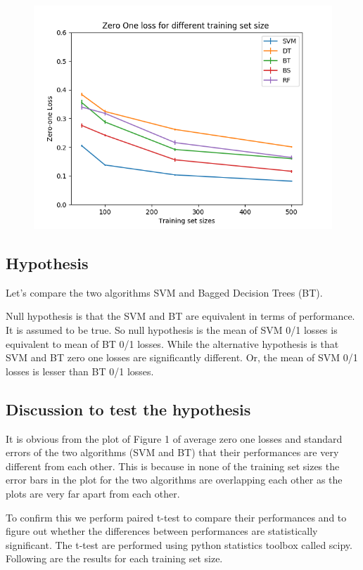 \documentclass[12pt]{article}
\begin{document}
\begin{figure}
	\centering
	\includegraphics{Analysis1.png}
\end{figure}

\subsection{Hypothesis}

Let's compare the two algorithms SVM and Bagged Decision Trees (BT). 

Null hypothesis is that the SVM and BT are equivalent in terms of performance. It is assumed
to be true. So null hypothesis is the mean of SVM 0/1 losses is equivalent to mean of BT 0/1 losses. 
While the alternative hypothesis is that SVM and BT zero one losses are significantly different.
Or, the mean of SVM 0/1 losses is lesser than BT 0/1 losses.

\subsection{Discussion to test the hypothesis}

It is obvious from the plot of Figure 1 of average zero one losses and standard errors of the two
algorithms (SVM and BT) that their performances are very different from each other. This is because
in none of the training set sizes the error bars in the plot for the two algorithms are overlapping
each other as the plots are very far apart from each other.

To confirm this we perform paired t-test to compare their performances and to figure out whether
the differences between performances are statistically significant. The t-test are performed using
python statistics toolbox called scipy. Following are the results for each training set size.\\
\end{document}
